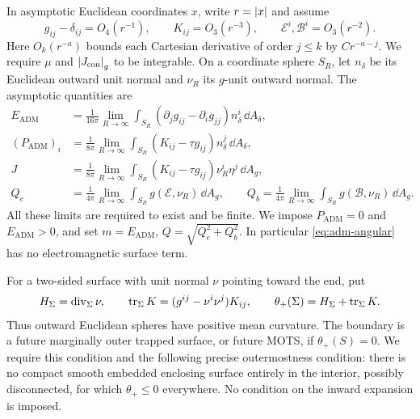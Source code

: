 In asymptotic Euclidean coordinates \(x\), write \(r=\left\lvert x\right\rvert\) and assume
\begin{equation}\label{eq:falloff}
 g_{ij}-\delta_{ij}=O_4(r^{-1}),\qquad
 K_{ij}=O_3(r^{-3}),\qquad
 \mathcal E^i,\mathcal B^i=O_3(r^{-2}).
\end{equation}
Here \(O_k(r^{-a})\) bounds each Cartesian derivative of order
\(j\le k\) by \(Cr^{-a-j}\). We require \(\mu\) and
\(\left\lvert J_{\mathrm{con}}\right\rvert_g\) to be integrable. On a coordinate sphere
\(S_R\), let \(n_\delta\) be its Euclidean outward unit normal and \(\nu_R\)
its \(g\)-unit outward normal. The asymptotic quantities are
\begin{align}
 E_{\mathrm{ADM}}
   &=\frac1{16\pi}\lim_{R\to\infty}
       \int_{S_R}(\partial_jg_{ij}-\partial_ig_{jj})
           n_\delta^i\,\dd A_\delta,\label{eq:adm-energy}\\
 (P_{\mathrm{ADM}})_i
   &=\frac1{8\pi}\lim_{R\to\infty}
       \int_{S_R}(K_{ij}-\tau g_{ij})n_\delta^j\,\dd A_\delta,
       \label{eq:adm-momentum}\\
 J&=\frac1{8\pi}\lim_{R\to\infty}
       \int_{S_R}(K_{ij}-\tau g_{ij})\nu_R^i\eta^j\,\dd A_g,
       \label{eq:adm-angular}\\
 Q_e&=\frac1{4\pi}\lim_{R\to\infty}
       \int_{S_R}g(\mathcal E,\nu_R)\,\dd A_g,
 \qquad
 Q_b=\frac1{4\pi}\lim_{R\to\infty}
       \int_{S_R}g(\mathcal B,\nu_R)\,\dd A_g.
       \label{eq:charges-definition}
\end{align}
All these limits are required to exist and be finite. We impose
\(P_{\mathrm{ADM}}=0\) and \(E_{\mathrm{ADM}}>0\), and set
\(m=E_{\mathrm{ADM}}\), \(Q=\sqrt{Q_e^2+Q_b^2}\).
In particular \eqref{eq:adm-angular} has no electromagnetic surface term.

For a two-sided surface with unit normal \(\nu\) pointing toward the end,
put
\begin{equation}\label{eq:expansion}
 H_\Sigma=\operatorname{div}_\Sigma\nu,
 \qquad \operatorname{tr}_\Sigma K=(g^{ij}-\nu^i\nu^j)K_{ij},
 \qquad \theta_+(\Sigma)=H_\Sigma+\operatorname{tr}_\Sigma K.
\end{equation}
Thus outward Euclidean spheres have positive mean curvature. The boundary
is a future marginally outer trapped surface, or future MOTS, if
\(\theta_+(S)=0\). We require this condition and the following precise
outermostness condition: there is no compact smooth embedded enclosing
surface entirely in the interior, possibly disconnected, for which
\(\theta_+\le0\) everywhere. No condition on the inward expansion is imposed.

